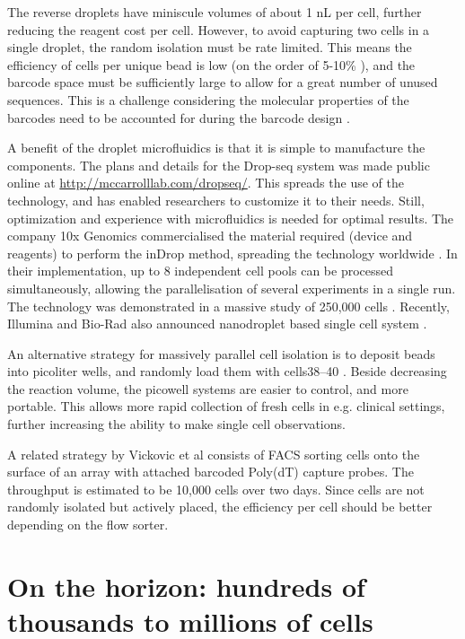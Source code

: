 The reverse droplets have miniscule volumes of about 1 nL per cell, further reducing the
reagent cost per cell. However, to avoid capturing two cells in a single droplet, the random
isolation must be rate limited. This means the efficiency of cells per unique bead is low (on
the order of 5-10\% \cite{Klein2015-ti, Macosko2015-jb}), and the barcode space must be sufficiently large to allow for a great number of unused sequences. This is a challenge considering the molecular properties of the barcodes need to be accounted for during the barcode design \cite{Costea2013-oj}.

A benefit of the droplet microfluidics is that it is simple to manufacture the components. The plans and details for the Drop-seq system was made public online at \url{http://mccarrolllab.com/dropseq/}. This spreads the use of the technology, and has enabled researchers to customize it to their needs. Still, optimization and experience with microfluidics is needed for optimal results. The company 10x Genomics commercialised the material required (device and reagents) to perform the inDrop method, spreading the technology worldwide \cite{10x_Genomics_Inc2016-do}. In their implementation, up to 8 independent cell pools can be processed simultaneously, allowing the parallelisation of several experiments in a single run. The technology was demonstrated in a massive study of 250,000 cells \cite{Zheng2017-th}. Recently, Illumina and Bio-Rad also announced nanodroplet based single cell system \cite{Illumina_Inc2017-wj}.

An alternative strategy for massively parallel cell isolation is to deposit beads into picoliter wells, and randomly load them with cells38–40 \cite{Christina_Fan2015-dy, Gierahn2017-xv, Bose2015-dt}. Beside decreasing the reaction volume, the picowell systems are easier to control, and more portable. This allows more rapid collection of fresh cells in e.g. clinical settings, further increasing the ability to make single cell observations.

A related strategy by Vickovic et al \cite{Vickovic2016-or} consists of FACS sorting cells onto the surface of an array with attached barcoded Poly(dT) capture probes. The throughput is estimated to be 10,000 cells over two days. Since cells are not randomly isolated but actively placed, the efficiency per cell should be better depending on the flow sorter.

\section{On the horizon: hundreds of thousands to millions of cells}


